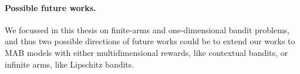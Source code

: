\paragraph{Possible future works.}
%
We focussed in this thesis on finite-arms and one-dimensional bandit problems,
and thus two possible directions of future works could be to extend our works
to MAB models with either multidimensional rewards, like contextual bandits, or infinite arms, like Lipschitz bandits.



